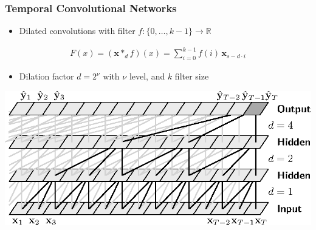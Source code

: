 \documentclass{beamer}
\begin{document}
\begin{frame}
\frametitle{Temporal Convolutional Networks}
\begin{itemize}
\item  Dilated convolutions with filter $f:\{ 0, \dots, k-1\} \rightarrow \mathbb R$
\end{itemize}
\vspace{-0.5em}
\begin{align}
F(x) = (\mathbf x *_d f)(x) = \sum_{i=0}^{k-1} f(i) \, \mathbf x_{s-d\cdot i}
\end{align}
\vspace{-0.5em}
\begin{itemize}
\item Dilation factor $d = 2^\nu$ with $\nu$ level, and $k$ filter size
\end{itemize}
\vspace{1em}
\begin{minipage}{\textwidth} 
\centering
\includegraphics[scale=0.8]{figures/dilated_conv_full.eps}
\end{minipage}

\end{frame}
\end{document}
